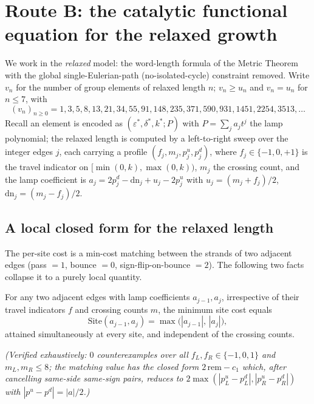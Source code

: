 
\section{Route B: the catalytic functional equation for the relaxed growth}
\label{sec:routeb}

We work in the \emph{relaxed} model: the word-length formula of the Metric
Theorem with the global single-Eulerian-path (no-isolated-cycle) constraint
removed. Write $v_n$ for the number of group elements of relaxed length $n$;
$v_n\ge u_n$ and $v_n=u_n$ for $n\le 7$, with
\[
(v_n)_{n\ge0}=1,3,5,8,13,21,34,55,91,148,235,371,590,931,1451,2254,3513,\dots
\]
Recall an element is encoded as $(\varepsilon^\ast,\delta^\ast,k^\ast;P)$ with
$P=\sum_j a_j t^j$ the lamp polynomial; the relaxed length is computed by a
left-to-right sweep over the integer edges $j$, each carrying a profile
$(f_j,m_j,p^u_j,p^d_j)$, where $f_j\in\{-1,0,+1\}$ is the travel indicator on
$[\min(0,k),\max(0,k))$, $m_j$ the crossing count, and the lamp coefficient is
$a_j=2p^d_j-\mathrm{dn}_j+u_j-2p^u_j$ with $u_j=(m_j+f_j)/2$, $\mathrm{dn}_j=(m_j-f_j)/2$.

\subsection{A local closed form for the relaxed length}

The per-site cost is a min-cost matching between the strands of two adjacent
edges (pass $=1$, bounce $=0$, sign-flip-on-bounce $=2$). The following two facts
collapse it to a purely local quantity.

\begin{lemma}\label{lem:localcost}
For any two adjacent edges with lamp coefficients $a_{j-1},a_j$, irrespective of
their travel indicators $f$ and crossing counts $m$, the minimum site cost equals
\[
   \mathrm{Site}(a_{j-1},a_j)=\max\bigl(|a_{j-1}|,\,|a_j|\bigr),
\]
attained simultaneously at every site, and independent of the crossing counts.
\end{lemma}

\noindent\emph{(Verified exhaustively: $0$ counterexamples over all
$f_L,f_R\in\{-1,0,1\}$ and $m_L,m_R\le 8$; the matching value has the closed form
$2\,\mathrm{rem}-c_1$ which, after cancelling same-side same-sign pairs, reduces to
$2\max(|p^u_L-p^d_L|,|p^u_R-p^d_R|)$ with $|p^u-p^d|=|a|/2$.)}

